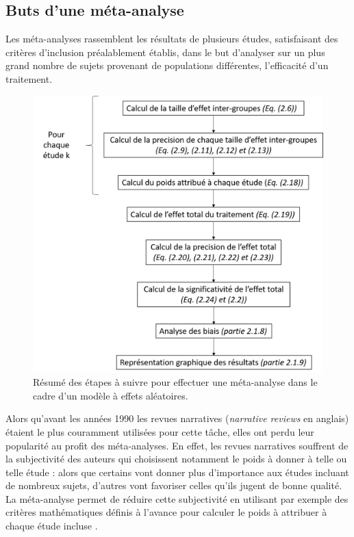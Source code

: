\subsection{Buts d'une méta-analyse}

Les méta-analyses rassemblent les résultats de plusieurs études, satisfaisant des critères d'inclusion préalablement établis, dans le but d'analyser
sur un plus grand nombre de sujets provenant de populations différentes, l'efficacité d'un traitement. 

\begin{figure}[h!]
  \centering
	\includegraphics[width=1.0\linewidth]{figures/chapter-2/pipeline-perform-meta-analysis} 
  \caption{Résumé des étapes à suivre pour effectuer une méta-analyse dans le cadre d'un modèle à effets aléatoires.}
  \label{Figure:pipeline_meta_analyse}
\end{figure}

Alors qu'avant les années 1990 les revues narratives (\textit{narrative reviews} en anglais) étaient le plus couramment utilisées pour cette tâche, elles ont 
perdu leur popularité au profit des méta-analyses. En effet, les revues narratives souffrent de la subjectivité des auteurs qui choisissent notamment le poids 
à donner à telle ou telle étude : alors que certains
vont donner plus d'importance aux études incluant de nombreux sujets, d'autres vont favoriser celles qu'ils jugent de bonne qualité. La méta-analyse permet 
de réduire cette subjectivité en utilisant par exemple des critères mathématiques définis à l'avance pour calculer le poids à attribuer à chaque étude incluse
\citep[Chapitre~1]{Borenstein2009}. 


